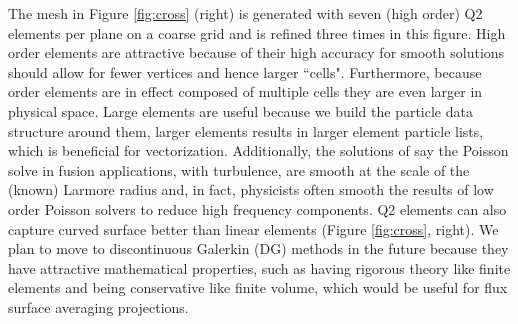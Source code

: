 \documentclass[review]{siamart}
\begin{document}
The mesh in Figure \ref{fig:cross} (right) is generated with seven (high order) Q2 elements per plane on a coarse grid and is refined three times in this figure.
High order elements are attractive because of their high accuracy for smooth solutions should allow for fewer vertices and hence larger ``cells".
Furthermore, because order elements are in effect composed of multiple cells they are even larger in physical space.
Large elements are useful because we build the particle data structure around them, larger elements results in larger element particle lists, which is beneficial for vectorization.
Additionally, the solutions of say the Poisson solve in fusion applications, with turbulence, are smooth at the scale of the (known) Larmore radius and, in fact, physicists often smooth the results of low order Poisson solvers to reduce high frequency components.
Q2 elements can also capture curved surface better than linear elements (Figure \ref{fig:cross}, right).
We plan to move to discontinuous Galerkin (DG) methods in the future because they have attractive mathematical properties, such as having rigorous theory like finite elements and being conservative like finite volume, which would be useful for flux surface averaging projections.


 
\end{document}
